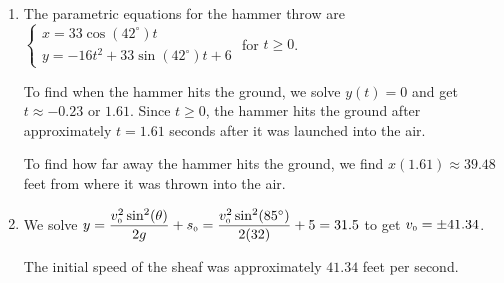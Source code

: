 \documentclass{ximera}
\begin{document}
\begin{enumerate} 
\setcounter{enumi}{\value{HW}}

\item  The parametric equations for the hammer throw are ${\displaystyle \left\{ \begin{array}{l} x = 33 \cos(42^{\circ}) t \\ [4pt] y =-16t^2 +  33 \sin(42^{\circ}) t + 6 \end{array} \right.}$ for $t \geq 0$.  

\smallskip

To find when the hammer hits the ground, we solve $y(t) = 0$ and get $t \approx -0.23$ or $1.61$.  Since $t \geq 0$, the hammer hits the ground after approximately $t = 1.61$ seconds after it was launched into the air.  

\smallskip

To find how far away the hammer hits the ground, we find $x(1.61) \approx 39.48$ feet from where it was thrown into the air.

\addtocounter{enumi}{1}

\item  We solve $y = \dfrac{v_{\text{\tiny$0$}}^2 \sin^{2}(\theta)}{2g} + s_{\text{\tiny $0$}}  = \dfrac{v_{\text{\tiny$0$}}^2 \sin^{2}(85^{\circ})}{2(32)} + 5 = 31.5$ to get $v_{\text{\tiny$0$}} = \pm 41.34$.  

\smallskip

The initial speed of the sheaf was approximately $41.34$ feet per second.

\setcounter{HW}{\value{enumi}}
\end{enumerate}
\end{document}
